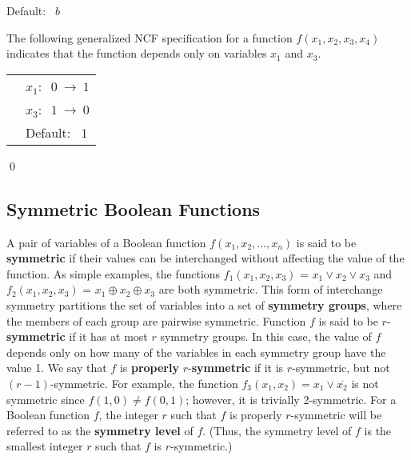 \smallskip

\hspace*{1.1in} Default:~ $b$ 

\smallskip

\noindent
The following generalized NCF specification for 
a function $f(x_1, x_2, x_3, x_4)$ indicates that the function
depends only on variables $x_1$ and $x_3$.

\medskip

\noindent
\begin{tabular}{ll}
\hspace*{1.1in} & $x_1:~$  $0 ~\longrightarrow~ 1$ \\ [1ex]
\hspace*{1.1in} & $x_3:~$  $1 ~\longrightarrow~ 0$ \\ [1ex]
\hspace*{1.1in} & Default:~ $1$ \\
\end{tabular}

\noindent
\qed



\subsection{Symmetric Boolean Functions}
\label{sse:symmetry}

A pair of variables of a Boolean function $f(x_1, x_2, \ldots, x_n)$ is
said to be \textbf{symmetric} if their values can be interchanged without
affecting the value of the function.
As simple examples, the functions 
$f_1(x_1, x_2, x_3)$ = $x_1 \vee x_2 \vee x_3$ and
$f_2(x_1, x_2, x_3)$ = $x_1 \oplus x_2 \oplus x_3$ are both symmetric.
This form of interchange symmetry partitions the set of variables into a set of
\textbf{symmetry groups}, where the members of each group are pairwise symmetric.
Function $f$ is said to be
$r$-\textbf{symmetric} if it has at most $r$ symmetry groups.
In this case, the value of $f$
depends only on how many of the variables in each symmetry group have the value 1.
We say that $f$ is \textbf{properly} $r$-\textbf{symmetric} if
it is $r$-symmetric, but not $(r-1)$-symmetric.
For example, the function $f_3(x_1, x_2) = x_1 \vee \overline{x_2}$
is not symmetric since $f(1, 0) \neq f(0, 1)$; however, 
it is trivially 2-symmetric.
For a Boolean function $f$, the integer $r$ such that $f$ is properly $r$-symmetric
will be referred to as the \textbf{symmetry level} of $f$.
(Thus, the symmetry level of $f$ is the smallest integer $r$ such that
$f$ is $r$-symmetric.)

